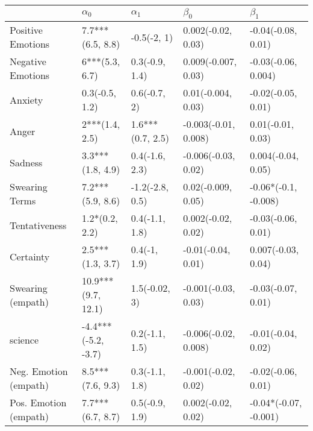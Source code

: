 \begin{tabular}{lllll}
\toprule
{} &           $\alpha_0$ &        $\alpha_1$ &             $\beta_0$ &              $\beta_1$ \\
\midrule
Positive Emotions     &     7.7***(6.5, 8.8) &       -0.5(-2, 1) &    0.002(-0.02, 0.03) &     -0.04(-0.08, 0.01) \\
Negative Emotions     &       6***(5.3, 6.7) &    0.3(-0.9, 1.4) &   0.009(-0.007, 0.03) &    -0.03(-0.06, 0.004) \\
Anxiety               &       0.3(-0.5, 1.2) &      0.6(-0.7, 2) &    0.01(-0.004, 0.03) &     -0.02(-0.05, 0.01) \\
Anger                 &       2***(1.4, 2.5) &  1.6***(0.7, 2.5) &  -0.003(-0.01, 0.008) &      0.01(-0.01, 0.03) \\
Sadness               &     3.3***(1.8, 4.9) &    0.4(-1.6, 2.3) &   -0.006(-0.03, 0.02) &     0.004(-0.04, 0.05) \\
Swearing Terms        &     7.2***(5.9, 8.6) &   -1.2(-2.8, 0.5) &    0.02(-0.009, 0.05) &   -0.06*(-0.1, -0.008) \\
Tentativeness         &       1.2*(0.2, 2.2) &    0.4(-1.1, 1.8) &    0.002(-0.02, 0.02) &     -0.03(-0.06, 0.01) \\
Certainty             &     2.5***(1.3, 3.7) &      0.4(-1, 1.9) &    -0.01(-0.04, 0.01) &     0.007(-0.03, 0.04) \\
Swearing (empath)     &   10.9***(9.7, 12.1) &     1.5(-0.02, 3) &   -0.001(-0.03, 0.03) &     -0.03(-0.07, 0.01) \\
science               &  -4.4***(-5.2, -3.7) &    0.2(-1.1, 1.5) &  -0.006(-0.02, 0.008) &     -0.01(-0.04, 0.02) \\
Neg. Emotion (empath) &     8.5***(7.6, 9.3) &    0.3(-1.1, 1.8) &   -0.001(-0.02, 0.02) &     -0.02(-0.06, 0.01) \\
Pos. Emotion (empath) &     7.7***(6.7, 8.7) &    0.5(-0.9, 1.9) &    0.002(-0.02, 0.02) &  -0.04*(-0.07, -0.001) \\
\bottomrule
\end{tabular}
